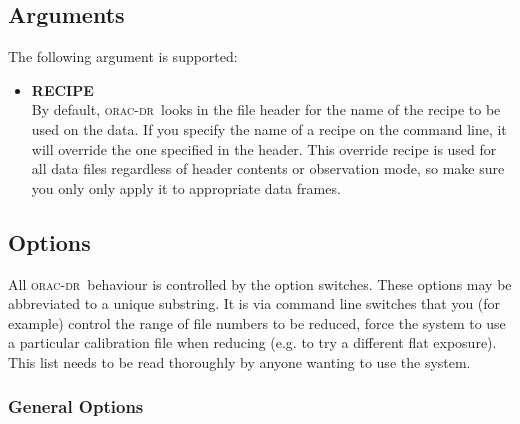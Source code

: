 \documentclass[twoside,11pt]{article}
\renewcommand{\_}{\texttt{\symbol{95}}}
\newcommand{\oracdr}{\textsc{orac-dr}}
\begin{document}
\subsection*{Arguments}

The following argument  is  supported:

\begin{itemize}

\item{\bf RECIPE}
\hfil\\
By default, \oracdr\ looks in the file header for the name of the
recipe to be used on the data. If you specify the name of a recipe on
the command line, it will override the one specified in the
header. This override recipe is used for all data files regardless of
header contents or observation mode, so make sure you only only apply
it to appropriate data frames.

\end{itemize}

\subsection*{Options}

All \oracdr\ behaviour is controlled by the option
switches. These options may be abbreviated to a unique substring. It
is via command line switches that you (for example) control the range
of file numbers to be reduced, force the system to use a particular
calibration file when reducing (e.g. to try a different flat
exposure). This list needs to be read thoroughly by anyone wanting to
use the system.

\subsubsection*{General Options}
\end{document}
